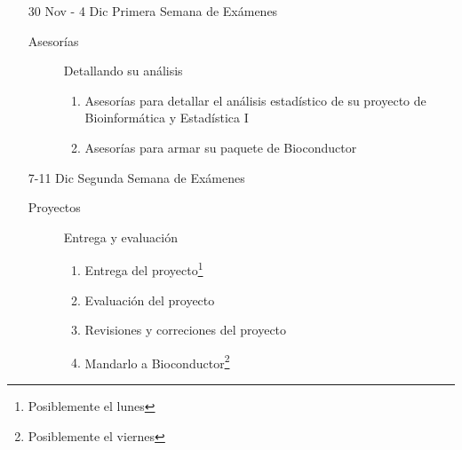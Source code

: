 \documentclass[letterpaper,12pt]{article}
\begin{document}
\begin{itemize}
  \item[30 Nov - 4 Dic] Primera Semana de Exámenes
  \begin{description}
  \item[Asesorías] Detallando su análisis
  \begin{enumerate}
  \item Asesorías para detallar el análisis estadístico de su proyecto de Bioinformática y Estadística I
  \item Asesorías para armar su paquete de Bioconductor
  \end{enumerate}
  \end{description}
  
  \item[7-11 Dic] Segunda Semana de Exámenes
  \begin{description}
  \item[Proyectos] Entrega y evaluación
  \begin{enumerate}
  \item Entrega del proyecto\footnote{Posiblemente el lunes}
  \item Evaluación del proyecto
  \item Revisiones y correciones del proyecto
  \item Mandarlo a Bioconductor\footnote{Posiblemente el viernes}
  \end{enumerate}
  \end{description}

  
\end{itemize}
\end{document}
